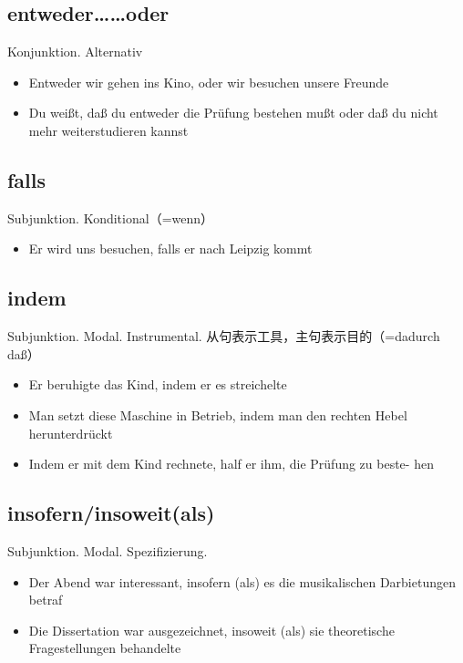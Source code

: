 \documentclass[UTF8]{report}
\begin{document}
\subsection{entweder……oder}
Konjunktion. Alternativ

\begin{itemize}
    \item Entweder wir gehen ins Kino, oder wir besuchen unsere Freunde
    \item Du weißt, daß du entweder die Prüfung bestehen mußt oder daß du nicht mehr weiterstudieren kannst
\end{itemize}

\subsection{falls}
Subjunktion. Konditional（=wenn）
\begin{itemize}
    \item Er wird uns besuchen, falls er nach Leipzig kommt
\end{itemize}

\subsection{indem}
Subjunktion. Modal. Instrumental. 从句表示工具，主句表示目的（=dadurch daß）
\begin{itemize}
    \item Er beruhigte das Kind, indem er es streichelte
    \item Man setzt diese Maschine in Betrieb, indem man den rechten Hebel herunterdrückt
    \item Indem er mit dem Kind rechnete, half er ihm, die Prüfung zu beste- hen
\end{itemize}

\subsection{insofern/insoweit(als)}
Subjunktion. Modal. Spezifizierung.
\begin{itemize}
    \item Der Abend war interessant, insofern (als) es die musikalischen Darbietungen betraf
    \item Die Dissertation war ausgezeichnet, insoweit (als) sie theoretische Fragestellungen behandelte
\end{itemize}
\end{document}
